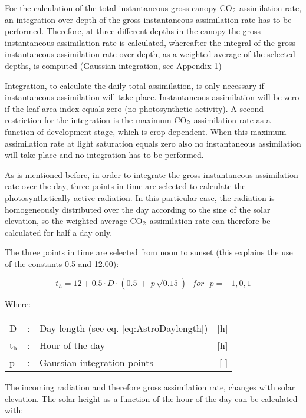 For the calculation of the total instantaneous gross canopy CO$_{{\rm 2}}$ assimilation rate, an
integration over depth of the gross instantaneous assimilation rate has to be performed.
Therefore, at three different depths in the canopy the gross instantaneous assimilation rate
is calculated, whereafter the integral of the gross instantaneous assimilation rate over
depth, as a weighted average of the selected depths, is computed (Gaussian integration,
see Appendix 1)

Integration, to calculate the daily total assimilation, is only necessary if instantaneous
assimilation will take place. Instantaneous assimilation will be zero if the leaf area index
equals zero (no photosynthetic activity). A second restriction for the integration is the
maximum CO$_{{\rm 2}}$ assimilation rate as a function of development stage, which is crop
dependent. When this maximum assimilation rate at light saturation equals zero also no
instantaneous assimilation will take place and no integration has to be performed.

As is mentioned before, in order to integrate the gross instantaneous assimilation rate
over the day, three points in time are selected to calculate the photosynthetically active
radiation. In this particular case, the radiation is homogeneously distributed over the day
according to the sine of the solar elevation, so the weighted average CO$_{{\rm 2}}$ 
assimilation rate can therefore be calculated for half a day only.

The three points in time are selected from noon to sunset (this explains the use of the
constants 0.5 and 12.00):

\begin{equation}
t_{h} = 12 + 0.5 \cdot D \cdot (0.5 ~+~ p\, \sqrt{0.15}) ~~~ for ~~~ p = -1,0,1
\end{equation}

Where:\\[5pt]
\begin{tabularx}{\textwidth}{llXr}
	D &:& Day length (see eq. \ref{eq:AstroDaylength})    &    [h]\\
	t$_{{\rm h}}$ &:& Hour of the day  &      [h]\\
	p &:& Gaussian integration points  &      [-]\\
\end{tabularx}

The incoming radiation and therefore gross assimilation rate, changes with solar elevation. 
The solar height as a function of the hour of the day can be calculated with:

